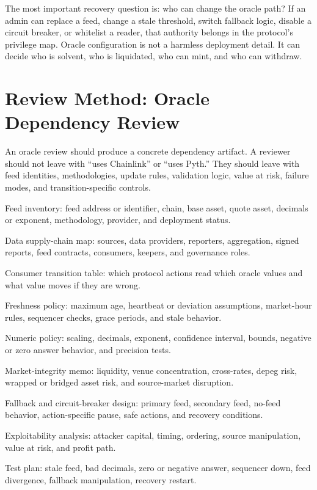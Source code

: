 The most important recovery question is: who can change the oracle path? If an admin can replace a feed, change a stale threshold, switch fallback logic, disable a circuit breaker, or whitelist a reader, that authority belongs in the protocol's privilege map. Oracle configuration is not a harmless deployment detail. It can decide who is solvent, who is liquidated, who can mint, and who can withdraw.

\section{Review Method: Oracle Dependency Review}

An oracle review should produce a concrete dependency artifact. A reviewer should not leave with ``uses Chainlink'' or ``uses Pyth.'' They should leave with feed identities, methodologies, update rules, validation logic, value at risk, failure modes, and transition-specific controls.

\begin{artifactbox}
\begin{artifactchecklist}
\item Feed inventory: feed address or identifier, chain, base asset, quote asset, decimals or exponent, methodology, provider, and deployment status.
\item Data supply-chain map: sources, data providers, reporters, aggregation, signed reports, feed contracts, consumers, keepers, and governance roles.
\item Consumer transition table: which protocol actions read which oracle values and what value moves if they are wrong.
\item Freshness policy: maximum age, heartbeat or deviation assumptions, market-hour rules, sequencer checks, grace periods, and stale behavior.
\item Numeric policy: scaling, decimals, exponent, confidence interval, bounds, negative or zero answer behavior, and precision tests.
\item Market-integrity memo: liquidity, venue concentration, cross-rates, depeg risk, wrapped or bridged asset risk, and source-market disruption.
\item Fallback and circuit-breaker design: primary feed, secondary feed, no-feed behavior, action-specific pause, safe actions, and recovery conditions.
\item Exploitability analysis: attacker capital, timing, ordering, source manipulation, value at risk, and profit path.
\item Test plan: stale feed, bad decimals, zero or negative answer, sequencer down, feed divergence, fallback manipulation, recovery restart.
\end{artifactchecklist}
\end{artifactbox}

